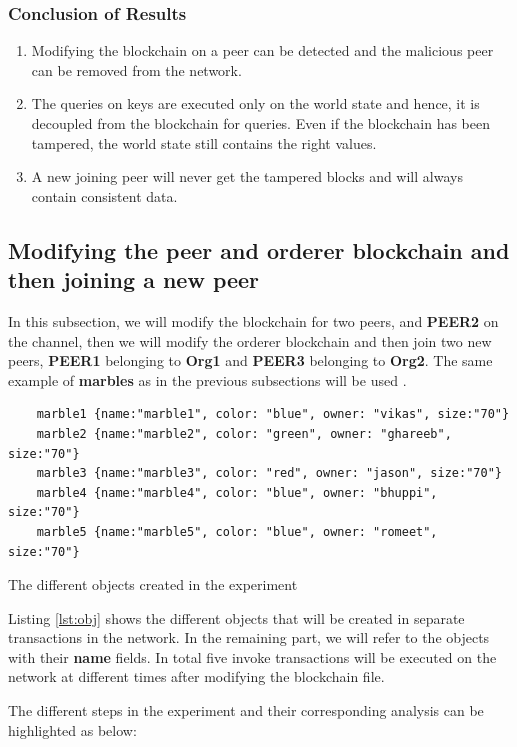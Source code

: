 \documentclass[
  a4paper,  %
  twoside,  %
  bibliography=totoc,
  headsepline,
  cleardoublepage=empty,
  parskip=half,
  draft=false
]{scrbook}
\begin{document}
\subsubsection{Conclusion of Results}
\begin{enumerate}
    \item Modifying the blockchain on a peer can be detected and the malicious peer can be removed from the network.
    \item The queries on keys are executed only on the world state and hence, it is decoupled from the blockchain for queries. Even if the blockchain has been tampered, the world state still contains the right values.
    \item A new joining peer will never get the tampered blocks and will always contain consistent data.
\end{enumerate}

\subsection{Modifying the peer and orderer blockchain and then joining a new peer}
In this subsection, we will modify the blockchain for two peers,  and \textbf{PEER2} on the channel, then we will modify the orderer blockchain and then join two new peers, \textbf{PEER1} belonging to \textbf{Org1} and \textbf{PEER3} belonging to \textbf{Org2}. The same example of \textbf{marbles} as in the previous subsections will be used \cite{marbles}. 
\begin{Listing}[h!]
\begin{lstlisting}
    marble1 {name:"marble1", color: "blue", owner: "vikas", size:"70"}
    marble2 {name:"marble2", color: "green", owner: "ghareeb", size:"70"}
    marble3 {name:"marble3", color: "red", owner: "jason", size:"70"}
    marble4 {name:"marble4", color: "blue", owner: "bhuppi", size:"70"}
    marble5 {name:"marble5", color: "blue", owner: "romeet", size:"70"}
\end{lstlisting}
\caption{The different objects created in the experiment}
\label{lst:obj}
\end{Listing}

Listing \ref{lst:obj} shows the different objects that will be created in separate transactions in the network. In the remaining part, we will refer to the objects with their \textbf{name} fields. In total five invoke transactions will be executed on the network at different times after modifying the blockchain file.

The different steps in the experiment and their corresponding analysis can be highlighted as below:
\end{document}
